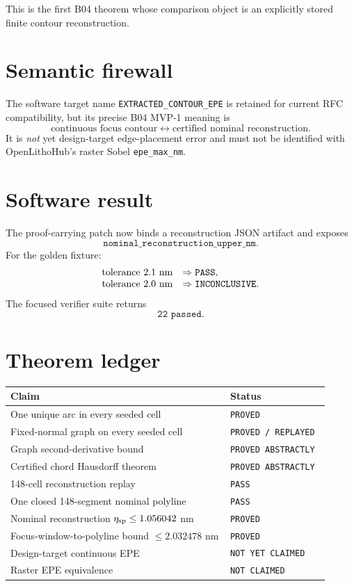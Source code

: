 \documentclass[11pt]{article}
\begin{document}
This is the first B04 theorem whose comparison object is an explicitly stored
finite contour reconstruction.

\section{Semantic firewall}

The software target name \texttt{EXTRACTED\_CONTOUR\_EPE} is retained for
current RFC compatibility, but its precise B04 MVP-1 meaning is
\[
\text{continuous focus contour}
\longleftrightarrow
\text{certified nominal reconstruction}.
\]
It is \emph{not} yet design-target edge-placement error and must not be
identified with OpenLithoHub's raster Sobel \texttt{epe\_max\_nm}.

\section{Software result}

The proof-carrying patch now binds a reconstruction JSON artifact and exposes
\[
\texttt{nominal\_reconstruction\_upper\_nm}.
\]
For the golden fixture:
\[
\begin{array}{ll}
\text{tolerance }2.1\ {\rm nm} &\Rightarrow \texttt{PASS},\\
\text{tolerance }2.0\ {\rm nm} &\Rightarrow \texttt{INCONCLUSIVE}.
\end{array}
\]
The focused verifier suite returns
\[
\boxed{\texttt{22 passed}}.
\]

\section{Theorem ledger}

\begin{longtable}{@{}p{0.62\linewidth}p{0.29\linewidth}@{}}
\toprule
Claim & Status\\
\midrule
\endhead
One unique arc in every seeded cell & \texttt{PROVED}\\
Fixed-normal graph on every seeded cell & \texttt{PROVED / REPLAYED}\\
Graph second-derivative bound & \texttt{PROVED ABSTRACTLY}\\
Certified chord Hausdorff theorem & \texttt{PROVED ABSTRACTLY}\\
148-cell reconstruction replay & \texttt{PASS}\\
One closed 148-segment nominal polyline & \texttt{PASS}\\
Nominal reconstruction \(\eta_{\rm sp}\le 1.056042\) nm
& \texttt{PROVED}\\
Focus-window-to-polyline bound \(\le 2.032478\) nm
& \texttt{PROVED}\\
Design-target continuous EPE & \texttt{NOT YET CLAIMED}\\
Raster EPE equivalence & \texttt{NOT CLAIMED}\\
\bottomrule
\end{longtable}
\end{document}
